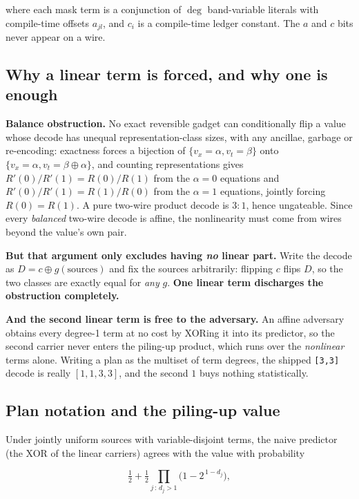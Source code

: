 \documentclass[11pt]{article}
\newcommand{\xor}{\oplus}
\newcommand{\code}[1]{\texttt{#1}}
\begin{document}
where each mask term is a conjunction of $\deg$ band-variable literals with
compile-time offsets $a_{jl}$, and $c_i$ is a compile-time ledger constant. The
$a$ and $c$ bits never appear on a wire.

\subsection{Why a linear term is forced, and why one is enough}

\textbf{Balance obstruction.} No exact reversible gadget can conditionally flip
a value whose decode has unequal representation-class sizes, with any ancillae,
garbage or re-encoding: exactness forces a bijection of
$\{v_x=\alpha, v_t=\beta\}$ onto $\{v_x=\alpha, v_t=\beta\xor\alpha\}$, and
counting representations gives $R'(0)/R'(1)=R(0)/R(1)$ from the $\alpha=0$
equations and $R'(0)/R'(1)=R(1)/R(0)$ from the $\alpha=1$ equations, jointly
forcing $R(0)=R(1)$. A pure two-wire product decode is $3{:}1$, hence
ungateable. Since every \emph{balanced} two-wire decode is affine, the
nonlinearity must come from wires beyond the value's own pair.

\textbf{But that argument only excludes having \emph{no} linear part.} Write
the decode as $D = c \xor g(\text{sources})$ and fix the sources arbitrarily:
flipping $c$ flips $D$, so the two classes are exactly equal for \emph{any}
$g$. \textbf{One linear term discharges the obstruction completely.}

\textbf{And the second linear term is free to the adversary.} An affine
adversary obtains every degree-1 term at no cost by XORing it into its
predictor, so the second carrier never enters the piling-up product, which runs
over the \emph{nonlinear} terms alone. Writing a plan as the multiset of term
degrees, the shipped \code{[3,3]} decode is really $[1,1,3,3]$, and the second
$1$ buys nothing statistically.

\subsection{Plan notation and the piling-up value}

Under jointly uniform sources with variable-disjoint terms, the naive predictor
(the XOR of the linear carriers) agrees with the value with probability

\begin{equation}
\tfrac12 + \tfrac12 \prod_{j \,:\, d_j > 1} \bigl(1 - 2^{\,1-d_j}\bigr),
\label{eq:piling}
\end{equation}
\end{document}
